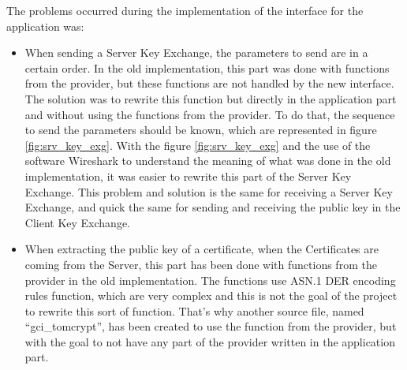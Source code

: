 The problems occurred during the implementation of the interface for the
application was:
\begin{itemize}
  \item When sending a Server Key Exchange, the parameters to send are in a
  certain order. In the old implementation, this part was
  done with functions from the provider, but these functions are not
  handled by the new interface. The solution was to rewrite this function
  but directly in the application part and without using the functions from the
  provider. To do that, the sequence to send the parameters should be known,
  which are represented in figure \ref{fig:srv_key_exg}. With the figure \ref{fig:srv_key_exg}
  and the use of the software Wireshark to understand the meaning of what was done in the
  old implementation, it was easier to rewrite this part of the Server Key Exchange.
  This problem and solution is the same for receiving a Server Key Exchange, and
  quick the same for sending and receiving the public key in the Client Key
  Exchange.
  \item When extracting the public key of a certificate, when the
  Certificates are coming from the Server, this part has been done with
  functions from the provider in the old implementation. The functions use
  ASN.1 DER encoding rules \cite{rec:der} function, which are very complex and
  this is not the goal of the project to rewrite this sort of function. That's why another
  source file, named ``gci\_tomcrypt'', has been created to use the function
  from the provider, but with the goal to not have any part of the provider written
  in the application part.
\end{itemize}


